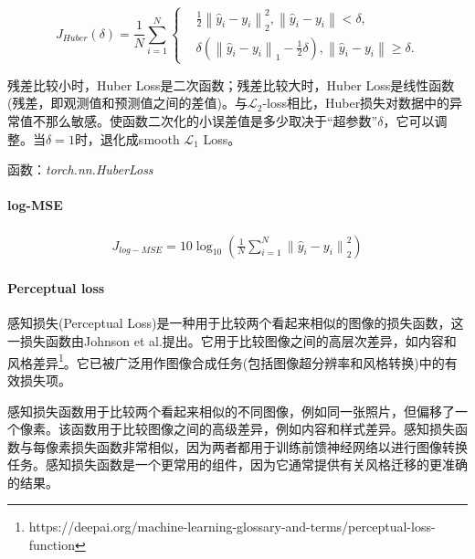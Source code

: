 \documentclass[letterpaper,12pt]{article}
\begin{document}
			\begin{equation}
			J_{Huber}(\delta)= \frac{1}{N}\sum_{i=1}^{N}
				\left\{
				\begin{aligned}
					&\frac{1}{2}{\left\|\hat{y}_i - y_i \right\|}_2^{2}, \left\| \hat{y}_i -y_i \right\| < \delta , \\
					&\delta\left({\left\|\hat{y}_i - y_i \right\|}_1 - \frac{1}{2}\delta \right), \left\| \hat{y}_i -y_i \right\| \geq \delta.
				\end{aligned}
				\right.
			\end{equation}
	
			残差比较小时，Huber Loss是二次函数；残差比较大时，Huber Loss是线性函数(残差，即观测值和预测值之间的差值)。与$\mathcal{L}_2$-loss相比，Huber损失对数据中的异常值不那么敏感。使函数二次化的小误差值是多少取决于“超参数”$\delta$，它可以调整。当$\delta=1$时，退化成smooth $\mathcal{L}_1$ Loss。
	
			函数：\textit{torch.nn.HuberLoss}
			
			\paragraph{log-MSE}
			
			\begin{equation}
				\begin{aligned}
					J_{log-MSE} = 10\log_{10}\left(\frac{1}{N} \sum_{i=1}^{N} {\| \hat{y}_i - y_i \|}_{2}^2 \right)
				\end{aligned}
			\end{equation}
	
			\paragraph{Perceptual loss}
			
			感知损失(Perceptual Loss)是一种用于比较两个看起来相似的图像的损失函数，这一损失函数由Johnson et al.\cite{johnson2016perceptual}提出。它用于比较图像之间的高层次差异，如内容和风格差异\footnote{https://deepai.org/machine-learning-glossary-and-terms/perceptual-loss-function}。它已被广泛用作图像合成任务(包括图像超分辨率和风格转换)中的有效损失项。
			
			感知损失函数用于比较两个看起来相似的不同图像，例如同一张照片，但偏移了一个像素。该函数用于比较图像之间的高级差异，例如内容和样式差异。感知损失函数与每像素损失函数非常相似，因为两者都用于训练前馈神经网络以进行图像转换任务。感知损失函数是一个更常用的组件，因为它通常提供有关风格迁移的更准确的结果。
			
\end{document}
